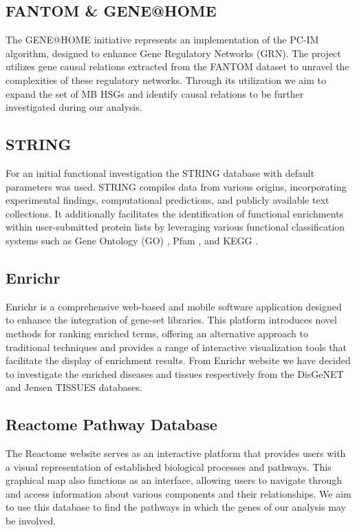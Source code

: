 \documentclass[10pt]{SelfArx} %
\begin{document}
\subsection{FANTOM \& GENE@HOME}\label{sec:Fantom_dataset}
The GENE@HOME \cite{asnicar2015tn} initiative represents an implementation of the PC-IM algorithm, designed to enhance Gene Regulatory Networks (GRN). The project utilizes gene causal relations extracted from the FANTOM dataset \cite{fantom5} to unravel the complexities of these regulatory networks.
Through its utilization we aim to expand the set of MB HSGs and identify causal relations to be further investigated during our analysis.


\subsection{STRING}
For an initial functional investigation the STRING database \cite{szklarczyk2019string} with default parameters was used. STRING compiles data from various origins, incorporating experimental findings, computational predictions, and publicly available text collections. It additionally facilitates the identification of functional enrichments within user-submitted protein lists by leveraging various functional classification systems such as Gene Ontology (GO) \cite{ashburner2000gene}, Pfam \cite{mistry2021pfam}, and KEGG \cite{kanehisa2000kegg}.

\subsection{Enrichr}
Enrichr \cite{kuleshov2016enrichr} is a comprehensive web-based and mobile software application designed to enhance the integration of gene-set libraries. This platform introduces novel methods for ranking enriched terms, offering an alternative approach to traditional techniques and provides a range of interactive visualization tools that facilitate the display of enrichment results. From Enrichr website we have decided to investigate the enriched diseases and tissues respectively from the DisGeNET \cite{pinero2016disgenet} and Jensen TISSUES \cite{10.1093/database/bay003} databases.

\subsection{Reactome Pathway Database}
The Reactome website \cite{gillespie2022reactome} serves as an interactive platform that provides users with a visual representation of established biological processes and pathways. This graphical map also functions as an interface, allowing users to navigate through and access information about various components and their relationships.
We aim to use this database to find the pathways in which the genes of our analysis may be involved.
\end{document}
